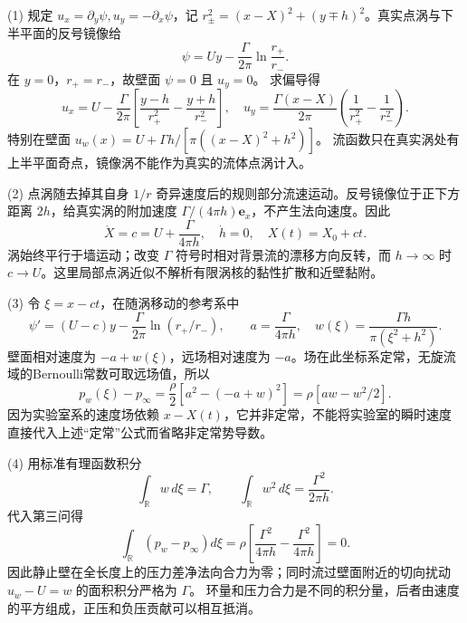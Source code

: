 (1) 规定 \(u_x=\partial_y\psi,u_y=-\partial_x\psi\)，记
\(r_\pm^2=(x-X)^2+(y\mp h)^2\)。真实点涡与下半平面的反号镜像给
\[
\psi=Uy-\frac{\Gamma}{2\pi}\ln\frac{r_+}{r_-}.
\]
在 \(y=0\)，\(r_+=r_-\)，故壁面 \(\psi=0\) 且 \(u_y=0\)。
求偏导得
\[
u_x=U-\frac{\Gamma}{2\pi}\left[
\frac{y-h}{r_+^2}-\frac{y+h}{r_-^2}\right],\quad
u_y=\frac{\Gamma(x-X)}{2\pi}\left(\frac1{r_+^2}-\frac1{r_-^2}\right).
\]
特别在壁面
\(u_w(x)=U+\Gamma h/[\pi((x-X)^2+h^2)]\)。
流函数只在真实涡处有上半平面奇点，镜像涡不能作为真实的流体点涡计入。

(2) 点涡随去掉其自身 \(1/r\) 奇异速度后的规则部分流速运动。反号镜像位于正下方距离 \(2h\)，给真实涡的附加速度
\(\Gamma/(4\pi h)\mathbf e_x\)，不产生法向速度。因此
\[
\dot X=c=U+\frac{\Gamma}{4\pi h},\quad
\dot h=0,\quad X(t)=X_0+ct.
\]
涡始终平行于墙运动；改变 \(\Gamma\) 符号时相对背景流的漂移方向反转，而
\(h\to\infty\) 时 \(c\to U\)。这里局部点涡近似不解析有限涡核的黏性扩散和近壁黏附。

(3) 令 \(\xi=x-ct\)，在随涡移动的参考系中
\[
\psi'=(U-c)y-\frac{\Gamma}{2\pi}\ln(r_+/r_-),
\qquad
a=\frac{\Gamma}{4\pi h},\quad
w(\xi)=\frac{\Gamma h}{\pi(\xi^2+h^2)}.
\]
壁面相对速度为 \(-a+w(\xi)\)，远场相对速度为 \(-a\)。场在此坐标系定常，无旋流域的Bernoulli常数可取远场值，所以
\[
p_w(\xi)-p_\infty
=\frac{\rho}{2}[a^2-(-a+w)^2]
=\rho[aw-w^2/2].
\]
因为实验室系的速度场依赖 \(x-X(t)\)，它并非定常，不能将实验室的瞬时速度直接代入上述“定常”公式而省略非定常势导数。

(4) 用标准有理函数积分
\[
\int_{\mathbb R}w\,d\xi=\Gamma,\qquad
\int_{\mathbb R}w^2\,d\xi=\frac{\Gamma^2}{2\pi h}.
\]
代入第三问得
\[
\int_{\mathbb R}(p_w-p_\infty)d\xi
=\rho\left[\frac{\Gamma^2}{4\pi h}
-\frac{\Gamma^2}{4\pi h}\right]=0.
\]
因此静止壁在全长度上的压力差净法向合力为零；同时流过壁面附近的切向扰动
\(u_w-U=w\) 的面积积分严格为 \(\Gamma\)。
环量和压力合力是不同的积分量，后者由速度的平方组成，正压和负压贡献可以相互抵消。
